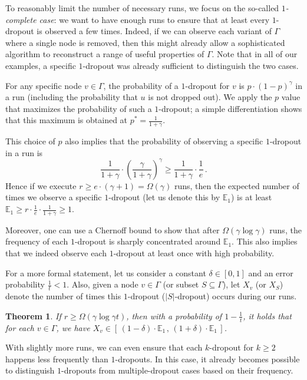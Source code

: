\documentclass{article}
\newtheorem{theorem}{Theorem}
\begin{document}
To reasonably limit the number of necessary runs, we focus on the so-called \emph{$1$-complete case}: we want to have enough runs to ensure that at least every $1$-dropout is observed a few times. Indeed, if we can observe each variant of $\Gamma$ where a single node is removed, then this might already allow a sophisticated algorithm to reconstruct a range of useful properties of $\Gamma$. Note that in all of our examples, a specific $1$-dropout was already sufficient to distinguish the two cases.

For any specific node $v \in \Gamma$, the probability of a $1$-dropout for $v$ is $p \cdot (1-p)^{\gamma}$ in a run (including the probability that $u$ is not dropped out). We apply the $p$ value that maximizes the probability of such a $1$-dropout; a simple differentiation shows that this maximum is obtained at $p^*=\frac{1}{1+\gamma}$.

This choice of $p$ also implies that the probability of observing a specific $1$-dropout in a run is 
\[ \frac{1}{1+\gamma} \cdot \left( \frac{\gamma}{1+ \gamma} \right)^{\gamma} \geq \frac{1}{1+\gamma} \cdot \frac{1}{e} \, . \]
Hence if we execute $r \geq e \cdot (\gamma+1) = \Omega(\gamma)$ runs, then the expected number of times we observe a specific $1$-dropout (let us denote this by $\mathbb{E}_1$) is at least $\mathbb{E}_1 \geq r \cdot \frac{1}{e} \cdot \frac{1}{1+\gamma} \geq 1$.

Moreover, one can use a Chernoff bound to show that after $ \Omega(\gamma \log \gamma)$ runs, the frequency of each $1$-dropout is sharply concentrated around $\mathbb{E}_1$. This also implies that we indeed observe each $1$-dropout at least once with high probability.

For a more formal statement, let us consider a constant $\delta \in [0,1]$ and an error probability $\frac{1}{t}<1$. Also, given a node $v \in \Gamma$ (or subset $S \subseteq \Gamma$), let $X_v$ (or $X_S$) denote the number of times this $1$-dropout ($|S|$-dropout) occurs during our runs.

\begin{theorem} \label{th:chernoff1}
If $r \geq \Omega \left( \gamma \log \gamma t \right)$, then with a probability of $1-\frac{1}{t}$, it holds that  for each $v \in \Gamma$, we have $X_v \in [\, (1\!-\!\delta) \cdot \mathbb{E}_{1\,}, \, (1\!+\!\delta) \cdot \mathbb{E}_1\, ]$.
\end{theorem}

With slightly more runs, we can even ensure that each $k$-dropout for $k \geq 2$ happens less frequently than $1$-dropouts. In this case, it already becomes possible to distinguish $1$-dropouts from multiple-dropout cases based on their frequency.
\end{document}
